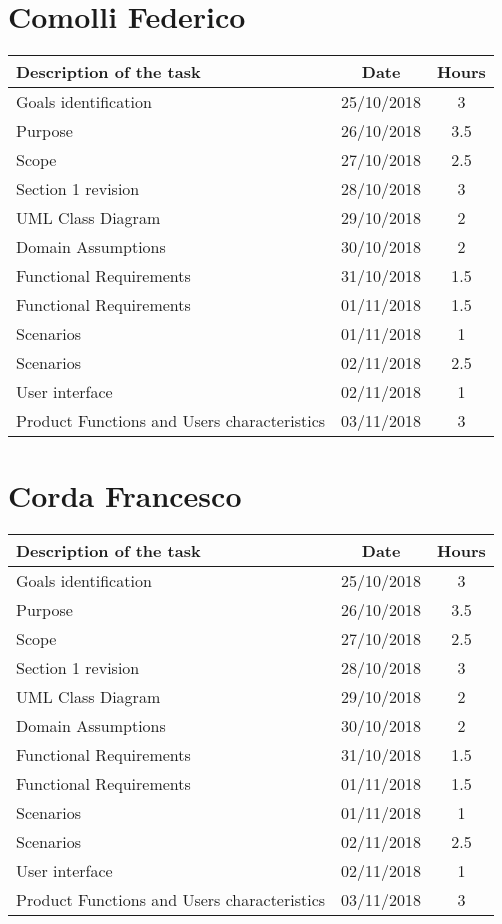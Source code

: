 \section{Comolli Federico}
\begin{center}
\begin{tabular}{l c c}
{\bf Description of the task}&{\bf Date}&{\bf Hours}\\ \hline
Goals identification & {25/10/2018} & {3} \\ \hline
Purpose & {26/10/2018} & {3.5} \\ \hline
Scope & {27/10/2018} & {2.5} \\ \hline
Section 1 revision & {28/10/2018} & {3} \\ \hline
UML Class Diagram & {29/10/2018} & {2} \\ \hline
Domain Assumptions & {30/10/2018} & {2} \\ \hline
Functional Requirements & {31/10/2018} & {1.5} \\ \hline
Functional Requirements & {01/11/2018} & {1.5} \\ \hline
Scenarios & {01/11/2018} & {1} \\ \hline
Scenarios & {02/11/2018} & {2.5} \\ \hline
User interface & {02/11/2018} & {1} \\ \hline
Product Functions and Users characteristics & {03/11/2018} & {3} \\ \hline
\end{tabular}
\end{center}

\section{Corda Francesco}
\begin{center}
\begin{tabular}{l c c}
{\bf Description of the task}&{\bf Date}&{\bf Hours}\\ \hline
Goals identification & {25/10/2018} & {3} \\ \hline
Purpose & {26/10/2018} & {3.5} \\ \hline
Scope & {27/10/2018} & {2.5} \\ \hline
Section 1 revision & {28/10/2018} & {3} \\ \hline
UML Class Diagram & {29/10/2018} & {2} \\ \hline
Domain Assumptions & {30/10/2018} & {2} \\ \hline
Functional Requirements & {31/10/2018} & {1.5} \\ \hline
Functional Requirements & {01/11/2018} & {1.5} \\ \hline
Scenarios & {01/11/2018} & {1} \\ \hline
Scenarios & {02/11/2018} & {2.5} \\ \hline
User interface & {02/11/2018} & {1} \\ \hline
Product Functions and Users characteristics & {03/11/2018} & {3} \\ \hline
\end{tabular}
\end{center}